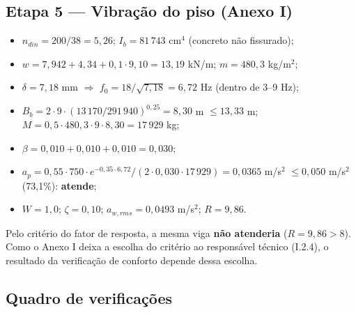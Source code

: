 \subsection{Etapa 5 --- Vibração do piso (Anexo I)}
\begin{itemize}
\item $n_{din} = 200/38 = 5{,}26$; $I_b = 81\,743$ cm\ensuremath{^4} (concreto não fissurado);
\item $w = 7{,}942 + 4{,}34 + 0{,}1 \cdot 9{,}10 = 13{,}19$ kN/m; $m = 480{,}3$ kg/m\ensuremath{^2};
\item $\delta = 7{,}18$ mm \ensuremath{\Rightarrow} $f_0 = 18/\sqrt{7{,}18} = 6{,}72$ Hz (dentro de 3--9 Hz);
\item $B_b = 2 \cdot 9 \cdot (13\,170/291\,940)^{0{,}25} = 8{,}30$ m $\le 13{,}33$ m; $M = 0{,}5 \cdot 480{,}3 \cdot 9 \cdot 8{,}30 = 17\,929$ kg;
\item $\beta = 0{,}010 + 0{,}010 + 0{,}010 = 0{,}030$;
\item $a_p = 0{,}55 \cdot 750 \cdot e^{-0{,}35 \cdot 6{,}72}/(2 \cdot 0{,}030 \cdot 17\,929) = 0{,}0365$ m/s\ensuremath{^2} $\le 0{,}050$ m/s\ensuremath{^2} (73,1\%): \textbf{atende};
\item $W = 1{,}0$; $\zeta = 0{,}10$; $a_{w,rms} = 0{,}0493$ m/s\ensuremath{^2}; $R = 9{,}86$.
\end{itemize}

Pelo critério do fator de resposta, a mesma viga \textbf{não atenderia} ($R = 9{,}86 > 8$). Como o Anexo I deixa a escolha do critério ao responsável técnico (I.2.4), o resultado da verificação de conforto depende dessa escolha.

\subsection{Quadro de verificações}

